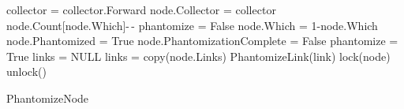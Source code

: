 \setlength{\textfloatsep}{0pt}
\begin{algorithm}[H]
	\scriptsize
	
		\begin{algorithmic}[1]
{}
\State collector = collector.Forward
\EndWhile
\State node.Collector = collector
\State node.Count[node.Which]-\,-
\State phantomize = False
\Else
{}
\State node.Which = 1-node.Which
\EndIf
{}
\State node.Phantomized = True
\State node.PhantomizationComplete = False
\State phantomize = True
\EndIf
\EndIf
\State links = NULL 
\State links = copy(node.Links)
\EndIf
{}
\State PhantomizeLink(link)
\EndFor
\State lock(node)
\State unlock()
\EndProcedure
\caption{PhantomizeNode}
\label{algorithm:phantomizenode}
\end{algorithmic}
\end{algorithm}



